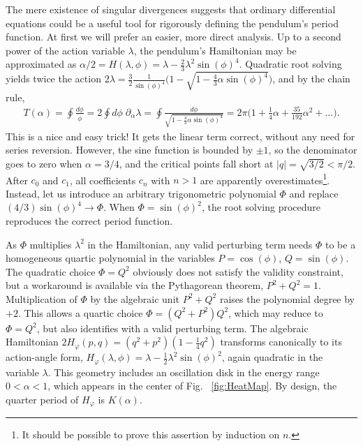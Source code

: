 \documentclass[nofootinbib,preprint]{revtex4-1}
\begin{document}
The mere existence of singular divergences suggests that ordinary differential equations 
could be a useful tool for rigorously defining the pendulum's period function. At first 
we will prefer an easier, more direct analysis. Up to a second power of the action variable 
$\lambda$, the pendulum's Hamiltonian may be approximated as 
$\alpha/2=H(\lambda,\phi)=\lambda - \frac{2}{3}\lambda^2\sin(\phi)^4 $. 
Quadratic root solving yields twice the action $2\lambda=\frac{3}{2}\frac{1}{\sin(\phi)^4}
\Big(1-\sqrt{1-\frac{4}{3}\alpha \sin(\phi)^4}\Big)$, 
and by the chain rule, 
\begin{eqnarray}
T(\alpha) = \oint \frac{d\phi}{\dot{\phi}} =2 \oint d\phi\; \partial_{\alpha}\lambda 
= \oint \frac{d\phi}{\sqrt{1-\frac{4}{3}\alpha \sin(\phi)^4}} = 2\pi\bigg(1 + 
\frac{1}{4}\alpha + \frac{35}{192}\alpha^2 + \ldots \bigg) \nonumber .
\end{eqnarray}
This is a nice and easy trick! It gets the linear term correct, without any need for series reversion. 
However, the sine function is bounded by $\pm 1$, so the denominator goes to zero when $\alpha=3/4$,
and the critical points fall short at $|q|=\sqrt{3/2}<\pi/2$. After $c_0$ and $c_1$, all 
coefficients $c_n$ with $n>1$ are apparently overestimates\footnote{It should be possible to
prove this assertion by induction on $n$.}. Instead, let us introduce an arbitrary 
trigonometric polynomial $\Phi$ and replace $(4/3)\sin(\phi)^4 \rightarrow \Phi $.
When $\Phi=\sin(\phi)^2$, the root solving procedure reproduces the correct period 
function. 

As $\Phi$ multiplies $\lambda^2$ in the Hamiltonian, any valid perturbing term needs $\Phi$ to 
be a homogeneous quartic polynomial in the variables $P=\cos(\phi)$, $Q=\sin(\phi)$. The quadratic 
choice $\Phi=Q^2$ obviously does not satisfy the validity constraint, but a workaround is available 
via the Pythagorean theorem, $P^2+Q^2=1$. Multiplication of $\Phi$ by the algebraic unit $P^2+Q^2$ 
raises the polynomial degree by $+2$. This allows a quartic choice $\Phi=(Q^2+P^2)Q^2$, 
which may reduce to $\Phi=Q^2$, but also identifies with a valid perturbing term. The algebraic Hamiltonian 
$2H_{\varphi}(p,q)=(q^2+p^2)(1-\frac{1}{4}q^2)$ transforms canonically to its action-angle form, 
$H_{\varphi}(\lambda,\phi)=\lambda - \frac{1}{2}\lambda^2\sin(\phi)^2 $, again quadratic in the variable $\lambda$.
This geometry includes an oscillation disk in the energy range $0<\alpha<1$, which appears in 
the center of Fig. ~\ref{fig:HeatMap}. By design, the quarter period of $H_{\varphi}$ is $K(\alpha)$.
\end{document}
